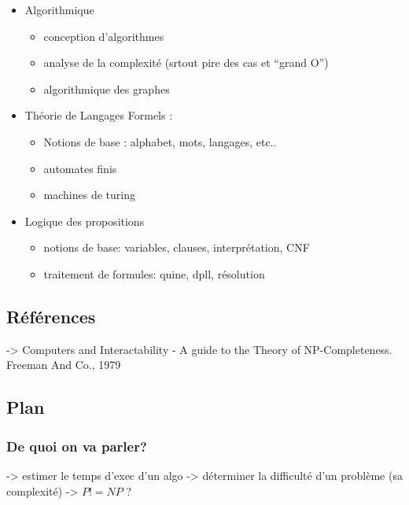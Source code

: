 \begin{itemize}
\tightlist
\item
  Algorithmique

  \begin{itemize}
  \tightlist
  \item
    conception d'algorithmes
  \item
    analyse de la complexité (srtout pire des cas et ``grand O'')
  \item
    algorithmique des graphes
  \end{itemize}
\item
  Théorie de Langages Formels :

  \begin{itemize}
  \tightlist
  \item
    Notions de base : alphabet, mots, langages, etc..
  \item
    automates finis
  \item
    machines de turing
  \end{itemize}
\item
  Logique des propositions

  \begin{itemize}
  \tightlist
  \item
    notions de base: variables, clauses, interprétation, CNF
  \item
    traitement de formules: quine, dpll, résolution
  \end{itemize}
\end{itemize}

\hypertarget{ruxe9fuxe9rences}{%
\subsection{Références}\label{ruxe9fuxe9rences}}

-\textgreater{} Computers and Interactability - A guide to the Theory of
NP-Completeness. Freeman And Co., 1979

\hypertarget{plan}{%
\subsection{Plan}\label{plan}}

\hypertarget{de-quoi-on-va-parler}{%
\subsubsection{De quoi on va parler?}\label{de-quoi-on-va-parler}}

-\textgreater{} estimer le temps d'exec d'un algo -\textgreater{}
déterminer la difficulté d'un problème (sa complexité) -\textgreater{}
\(P!=NP\) ?

